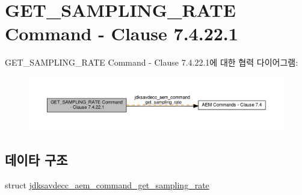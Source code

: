 \hypertarget{group__command__get__sampling__rate}{}\section{G\+E\+T\+\_\+\+S\+A\+M\+P\+L\+I\+N\+G\+\_\+\+R\+A\+TE Command -\/ Clause 7.4.22.1}
\label{group__command__get__sampling__rate}
G\+E\+T\+\_\+\+S\+A\+M\+P\+L\+I\+N\+G\+\_\+\+R\+A\+TE Command -\/ Clause 7.4.22.1에 대한 협력 다이어그램\+:
\nopagebreak
\begin{figure}[H]
\begin{center}
\leavevmode
\includegraphics[width=350pt]{group__command__get__sampling__rate}
\end{center}
\end{figure}
\subsection*{데이타 구조}
\begin{DoxyCompactItemize}
\item 
struct \hyperlink{structjdksavdecc__aem__command__get__sampling__rate}{jdksavdecc\+\_\+aem\+\_\+command\+\_\+get\+\_\+sampling\+\_\+rate}
\end{DoxyCompactItemize}
